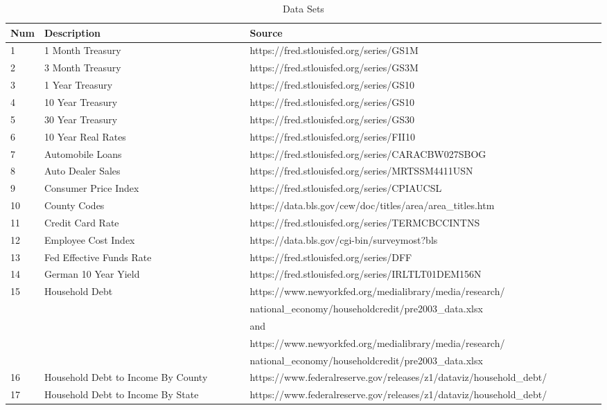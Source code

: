 \documentclass[sigconf,nonacm,11pt]{acmart}
\begin{document}
\begin{appendix}
\begin{table}[ht]
\caption{Data Sets}
\centering
\begin{tabular}{p{0.05\linewidth}p{0.35\linewidth}p{0.6\linewidth}}
\hline
Num & Description & Source\\
\hline
1 & 1 Month Treasury & https://fred.stlouisfed.org/series/GS1M\\
2 & 3 Month Treasury & https://fred.stlouisfed.org/series/GS3M\\
3 & 1 Year Treasury & https://fred.stlouisfed.org/series/GS10\\
4 & 10 Year Treasury & https://fred.stlouisfed.org/series/GS10\\
5 & 30 Year Treasury & https://fred.stlouisfed.org/series/GS30\\
6 & 10 Year Real Rates & https://fred.stlouisfed.org/series/FII10\\
7 & Automobile Loans & https://fred.stlouisfed.org/series/CARACBW027SBOG\\
8 & Auto Dealer Sales & https://fred.stlouisfed.org/series/MRTSSM4411USN\\
9 & Consumer Price Index & https://fred.stlouisfed.org/series/CPIAUCSL\\
10 & County Codes & https://data.bls.gov/cew/doc/titles/area/area_titles.htm\\
11 & Credit Card Rate & https://fred.stlouisfed.org/series/TERMCBCCINTNS\\
12 & Employee Cost Index & https://data.bls.gov/cgi-bin/surveymost?bls\\
13 & Fed Effective Funds Rate  & https://fred.stlouisfed.org/series/DFF\\
14 & German 10 Year Yield & https://fred.stlouisfed.org/series/IRLTLT01DEM156N\\
15 & Household Debt & https://www.newyorkfed.org/medialibrary/media/research/\\
 & & national\_economy/householdcredit/pre2003\_data.xlsx\\ 
 & & and\\
 & & https://www.newyorkfed.org/medialibrary/media/research/\\
 & & national\_economy/householdcredit/pre2003\_data.xlsx\\
16 & Household Debt to Income By County & https://www.federalreserve.gov/releases/z1/dataviz/household\_debt/\\
17 & Household Debt to Income By State  & https://www.federalreserve.gov/releases/z1/dataviz/household\_debt/\\

\end{tabular}
\end{table}
\end{appendix}
\end{document}
